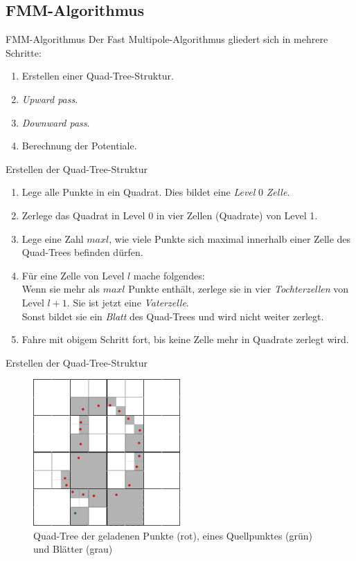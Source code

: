 \documentclass[ngerman]{beamer}
\begin{document}
\subsection{FMM-Algorithmus}
\begin{frame}{FMM-Algorithmus}
Der Fast Multipole-Algorithmus gliedert sich in mehrere Schritte:
\begin{enumerate}
\item Erstellen einer Quad-Tree-Struktur.
\item \emph{Upward pass}.
\item \emph{Downward pass}.
\item Berechnung der Potentiale.
\end{enumerate}
\end{frame}

\begin{frame}{Erstellen der Quad-Tree-Struktur}
\begin{enumerate}
\item Lege alle Punkte in ein Quadrat. Dies bildet eine \emph{Level} 0 \emph{Zelle}.
\item Zerlege das Quadrat in Level 0 in vier Zellen (Quadrate) von Level 1.
\item Lege eine Zahl $maxl$, wie viele Punkte sich maximal innerhalb einer Zelle des Quad-Trees befinden dürfen.
\item Für eine Zelle von Level $l$ mache folgendes:\\
Wenn sie mehr als $maxl$ Punkte enthält, zerlege sie in vier \emph{Tochterzellen} von Level $l+1$. Sie ist jetzt eine \emph{Vaterzelle}.\\
Sonst bildet sie ein \emph{Blatt} des Quad-Trees und wird nicht weiter zerlegt.
\item Fahre mit obigem Schritt fort, bis keine Zelle mehr in Quadrate zerlegt wird.
\end{enumerate}
\end{frame}

\begin{frame}{Erstellen der Quad-Tree-Struktur}
\begin{figure}
\includegraphics[width=0.5\textwidth]{quadtree.png}
\caption{Quad-Tree der geladenen Punkte (rot), eines Quellpunktes (grün) und Blätter (grau)}
\end{figure}
\end{frame}
\end{document}
